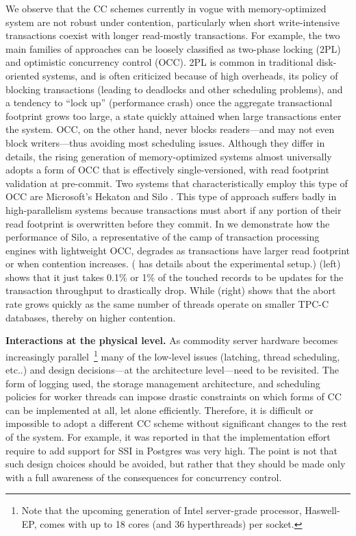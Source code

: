 We observe that the CC schemes currently in vogue with memory-optimized system are not robust under contention, particularly when short write-intensive transactions coexist with longer read-mostly transactions.
For example, the two main families of approaches can be loosely classified as two-phase locking (2PL) and optimistic concurrency control (OCC). 2PL is common in traditional disk-oriented systems, and is often criticized because of high overheads, its policy of blocking transactions (leading to deadlocks and other scheduling problems), and a tendency to ``lock up'' (performance crash) once the aggregate transactional footprint grows too large, a state quickly attained when large transactions enter the system. OCC, on the other hand, never blocks readers---and may not even block writers---thus avoiding most scheduling issues. Although they differ in details, the rising generation of memory-optimized systems almost universally adopts a form of OCC that is effectively single-versioned, with read footprint validation at pre-commit.  Two systems that characteristically employ this type of OCC are Microsoft's Hekaton \cite{LarsonBDFPZ11} and Silo \cite{TuZKLM13}. This type of approach suffers badly in high-parallelism systems \cite{YuBPDS14} because transactions must abort if any portion of their read footprint is overwritten before they commit. 
In  we demonstrate how the performance of Silo, a representative of the camp of transaction processing engines with lightweight OCC, degrades as transactions have larger read footprint or when contention increases. ( has details about the experimental setup.) (left) shows that it just takes 0.1\% or 1\% of the touched records to be updates for the transaction throughput to drastically drop. While (right) shows that the abort rate grows quickly as the same number of threads operate on smaller TPC-C databases, thereby on higher contention.

\vspace{2mm}
{\bf Interactions at the physical level.} 
As commodity server hardware becomes increasingly parallel~\footnote{Note that the upcoming generation of Intel server-grade processor, Haswell-EP, comes with up to 18 cores (and 36 hyperthreads) per socket.} many of the low-level issues (latching, thread scheduling, etc..) and design decisions---at the architecture level---need to be revisited. The form of logging used, the storage management architecture, and scheduling policies for worker threads can impose drastic constraints on which forms of CC can be implemented at all, let alone efficiently. 
Therefore, it is difficult or impossible to adopt a different CC scheme without significant changes to the rest of the system. 
For example, it was reported in \cite{PortsG12} that the implementation effort require to add support for SSI in Postgres was very high. 
The point is not that such design choices should be avoided, but rather that they should be made only with a full awareness of the consequences for concurrency control. 

